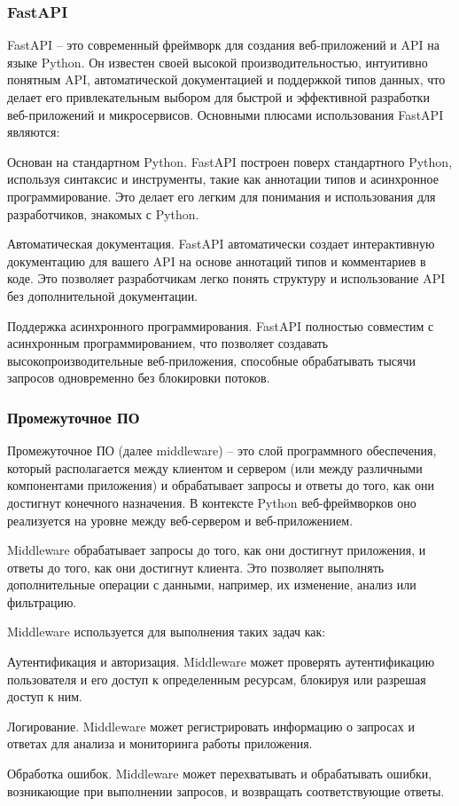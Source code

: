 \subsubsection{FastAPI}\label{subsubsec:domain:fastapi}
FastAPI -- это современный фреймворк для создания веб-приложений и API на языке Python.
Он известен своей высокой производительностью, интуитивно понятным API, автоматической документацией и поддержкой типов данных, что делает его привлекательным выбором для быстрой и эффективной разработки веб-приложений и микросервисов.
Основными плюсами использования FastAPI являются:
\begin{enumerate_num}
    \item Основан на стандартном Python.
    FastAPI построен поверх стандартного Python, используя синтаксис и инструменты, такие как аннотации типов и асинхронное программирование.
    Это делает его легким для понимания и использования для разработчиков, знакомых с Python.
    \item Автоматическая документация.
    FastAPI автоматически создает интерактивную документацию для вашего API на основе аннотаций типов и комментариев в коде.
    Это позволяет разработчикам легко понять структуру и использование API без дополнительной документации.
    \item Поддержка асинхронного программирования.
    FastAPI полностью совместим с асинхронным программированием, что позволяет создавать высокопроизводительные веб-приложения, способные обрабатывать тысячи запросов одновременно без блокировки потоков.
\end{enumerate_num}

\subsubsection{Промежуточное ПО}\label{subsubsec:domain:middleware}
Промежуточное ПО (далее middleware) -- это слой программного обеспечения, который располагается между клиентом и сервером (или между различными компонентами приложения) и обрабатывает запросы и ответы до того, как они достигнут конечного назначения.
В контексте Python веб-фреймворков оно реализуется на уровне между веб-сервером и веб-приложением.

Middleware обрабатывает запросы до того, как они достигнут приложения, и ответы до того, как они достигнут клиента.
Это позволяет выполнять дополнительные операции с данными, например, их изменение, анализ или фильтрацию.

Middleware используется для выполнения таких задач как:
\begin{enumerate_num}
    \item Аутентификация и авторизация.
    Middleware может проверять аутентификацию пользователя и его доступ к определенным ресурсам, блокируя или разрешая доступ к ним.
    \item Логирование.
    Middleware может регистрировать информацию о запросах и ответах для анализа и мониторинга работы приложения.
    \item Обработка ошибок.
    Middleware может перехватывать и обрабатывать ошибки, возникающие при выполнении запросов, и возвращать соответствующие ответы.
\end{enumerate_num}

